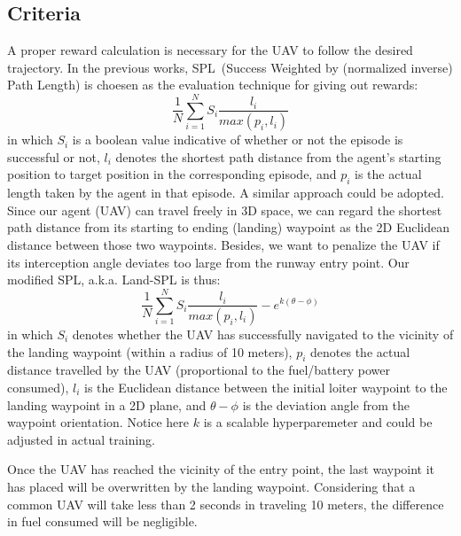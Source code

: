 \documentclass[10pt,twocolumn,letterpaper]{article}
\begin{document}
\subsection{Criteria}
A proper reward calculation is necessary for the UAV to follow the desired trajectory. In the previous works, SPL~\cite{Author10}(Success Weighted by (normalized inverse) Path Length) is choesen as the evaluation technique for giving out rewards:
\begin{equation}
\frac{1}{N} \sum_{i=1}^{N} S_i \frac{l_i}{max(p_i, l_i)}
\end{equation}
in which $S_i$ is a boolean value indicative of whether or not the episode is successful or not, $l_i$ denotes the shortest path distance from the agent's starting position to target position in the corresponding episode, and $p_i$ is the actual length taken by the agent in that episode. A similar approach could be adopted. Since our agent (UAV) can travel freely in 3D space, we can regard the shortest path distance from its starting to ending (landing) waypoint as the 2D Euclidean distance between those two waypoints. Besides, we want to penalize the UAV if its interception angle deviates too large from the runway entry point. Our modified SPL, a.k.a. Land-SPL is thus:
\begin{equation}
\frac{1}{N} \sum_{i=1}^{N} S_i \frac{l_i}{max(p_i, l_i)} - e^{k(\theta - \phi)}
\end{equation}
in which $S_i$ denotes whether the UAV has successfully navigated to the vicinity of the landing waypoint (within a radius of 10 meters), $p_i$ denotes the actual distance travelled by the UAV (proportional to the fuel/battery power consumed), $l_i$ is the Euclidean distance between the initial loiter waypoint to the landing waypoint in a 2D plane, and $\theta - \phi$ is the deviation angle from the waypoint orientation. Notice here $k$ is a scalable hyperparemeter and could be adjusted in actual training.

Once the UAV has reached the vicinity of the entry point, the last waypoint it has placed will be overwritten by the landing waypoint. Considering that a common UAV will take less than 2 seconds in traveling 10 meters, the difference in fuel consumed will be negligible. 
\end{document}
